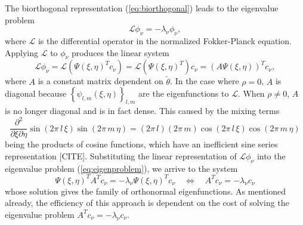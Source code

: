 \documentclass[10pt]{article}
\begin{document}
The biorthogonal representation (\ref{eq:biorthogonal}) leads to the
eigenvalue problem
\begin{equation}
  \mathcal{L} \phi_\nu = -\lambda_\nu \phi_\nu, \label{eq:eigenproblem}
\end{equation}
where $\mathcal{L}$ is the differential operator in the normalized
Fokker-Planck equation. Applying $\mathcal{L}$ to $\phi_\nu$ produces
the linear system
\[
  \mathcal{L}\phi_\nu = \mathcal{L}(\Psi(\xi,\eta)^T c_\nu) =
  \mathcal{L}(\Psi(\xi,\eta)^T) c_\nu = (A \Psi(\xi,\eta))^T c_\nu,
\] 
where $A$ is a constant matrix dependent on $\tilde{\theta}$. In the
case where $\rho = 0$, $A$ is diagonal because
$\left\{ \psi_{l,m}(\xi,\eta) \right\}_{l,m}$ are the eigenfunctions to
$\mathcal{L}$. When $\rho \neq 0$, $A$ is no longer diagonal and is in
fact dense. This caused by the mixing terms
\[
  \frac{\partial^2}{\partial \xi \partial \eta} \sin\left(2\pi\, l\,
    \xi\right) \sin\left(2\pi\, m\, \eta\right) = (2\pi\, l)(2\pi\, m)
  \cos\left(2\pi\, l\, \xi\right) \cos\left(2\pi\, m\, \eta\right)
\]
being the products of cosine functions, which have an inefficient sine
series representation [CITE]. Substituting the linear representation
of $\mathcal{L}\phi_\nu$ into the eigenvalue problem
(\ref{eq:eigenproblem}), we arrive to the system
\[
  \Psi(\xi,\eta)^T A^T c_\nu = -\lambda_\nu \Psi(\xi,\eta)^T c_\nu
  \quad \Leftrightarrow \quad A^T c_\nu = -\lambda_\nu c_\nu
\]
whose solution gives the family of orthonormal eigenfunctions. As
mentioned already, the efficiency of this approach is dependent on the
cost of solving the eigenvalue problem
$A^T c_\nu = -\lambda_\nu c_\nu$. 
\end{document}
